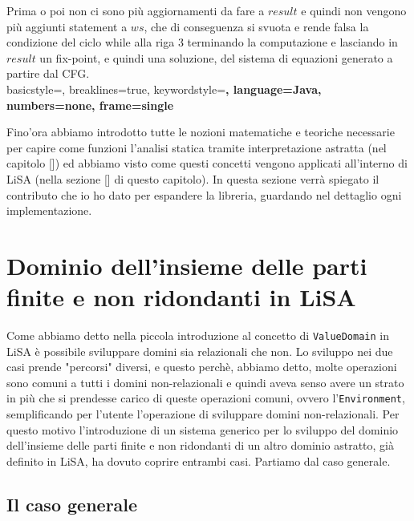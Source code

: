 Prima o poi non ci sono più aggiornamenti da fare a \(result\) e quindi non vengono più aggiunti statement a \(ws\), che di conseguenza si svuota e rende falsa la condizione del ciclo while alla riga 3 terminando la computazione e lasciando in \(result\) un fix-point, e quindi una soluzione, del sistema di equazioni generato a partire dal CFG.
\\

\lstset
    {
    basicstyle=\footnotesize\ttfamily,
    breaklines=true,
    keywordstyle=\color{keywordsColor}\bfseries,
    language=Java, 
    numbers=none,
    frame=single
    }

Fino'ora abbiamo introdotto tutte le nozioni matematiche e teoriche necessarie per capire come funzioni l'analisi statica tramite interpretazione astratta (nel capitolo []) ed abbiamo visto come questi concetti vengono applicati all'interno di LiSA (nella sezione [] di questo capitolo). In questa sezione verrà spiegato il contributo che io ho dato per espandere la libreria, guardando nel dettaglio ogni implementazione. 

\section{Dominio dell'insieme delle parti finite e non ridondanti in LiSA}

Come abbiamo detto nella piccola introduzione al concetto di \texttt{ValueDomain} in LiSA è possibile sviluppare domini sia relazionali che non. Lo sviluppo nei due casi prende "percorsi" diversi, e questo perchè, abbiamo detto, molte operazioni sono comuni a tutti i domini non-relazionali e quindi aveva senso avere un strato in più che si prendesse carico di queste operazioni comuni, ovvero l'\texttt{Environment}, semplificando per l'utente l'operazione di sviluppare domini non-relazionali. Per questo motivo l'introduzione di un sistema generico per lo sviluppo del dominio dell'insieme delle parti finite e non ridondanti di un altro dominio astratto, già definito in LiSA, ha dovuto coprire entrambi casi. Partiamo dal caso generale. 

\subsection{Il caso generale}


